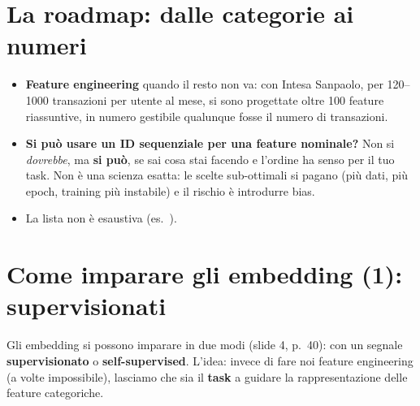 \section{La roadmap: dalle categorie ai numeri}
\begin{center}
\end{center}
\begin{itemize}
  \item \textbf{Feature engineering} quando il resto non va: con Intesa Sanpaolo, per 120--1000 transazioni per utente al mese, si sono
        progettate oltre 100 feature riassuntive, in numero gestibile qualunque fosse il numero di transazioni.
  \item \textbf{Si può usare un ID sequenziale per una feature nominale?} Non si \emph{dovrebbe}, ma \textbf{si può}, se sai cosa stai
        facendo e l'ordine ha senso per il tuo task. Non è una scienza esatta: le scelte sub-ottimali si pagano (più dati, più epoch,
        training più instabile) e il rischio è introdurre bias.
  \item La lista non è esaustiva (es.\ ).
\end{itemize}

\section{Come imparare gli embedding (1): supervisionati}
Gli embedding si possono imparare in due modi (slide 4, p.~40): con un segnale \textbf{supervisionato} o \textbf{self-supervised}.
L'idea: invece di fare noi feature engineering (a volte impossibile), lasciamo che sia il \textbf{task} a guidare la rappresentazione
delle feature categoriche.

